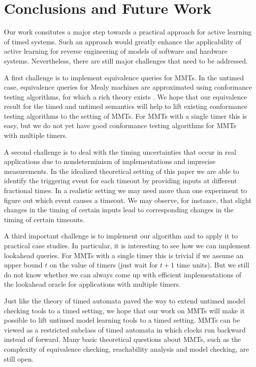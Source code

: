\section{Conclusions and Future Work}
Our work consitutes a major step towards a practical approach for active learning of timed systems.
Such an approach would greatly enhance the applicability of active learning for reverse engineering of models of
software and hardware systems. Nevertheless, there are still major challenges that need to be addressed.

A first challenge is to implement equivalence queries for MMTs.
In the untimed case, equivalence queries for Mealy machines are approximated using conformance testing algorithms,
for which a rich theory exists \cite{LeeY96}.
We hope that our equivalence result for the timed and untimed semantics will help to lift existing conformance
testing algorithms to the setting of MMTs. For MMTs with a single timer this is easy, but we do not yet have good
conformance testing algorithms for MMTs with multiple timers.

A second challenge is to deal with the timing uncertainties that occur in real applications due to nondeterminism of
implementations and imprecise measurements. In the idealized theoretical setting of this paper we are able to
identify the triggering event for each timeout by providing inputs at different fractional times. In a realistic
setting we may need more than one experiment to figure out which event causes a timeout. We may observe, for instance,
that slight changes in the timing of certain inputs lead to corresponding changes in the timing of certain timeouts.

A third important challenge is to implement our algorithm and to apply it to practical case studies. In particular,
it is interesting to see how we can implement lookahead queries. For MMTs with a single timer this is trivial 
if we assume an upper bound $t$ on the value of timers (just  wait for $t+1$ time units).
But we still do not know whether we can always come up with efficient implementations of the lookahead oracle for applications with multiple timers.

Just like the theory of timed automata \cite{AD94} paved the way to extend untimed model checking tools to a timed
setting, we hope that our work on MMTs will make it possible to lift untimed model learning tools to a timed setting.
MMTs can be viewed as a restricted subclass of timed automata in which clocks run backward instead of forward.
Many basic theoretical questions about MMTs, such as the complexity of equivalence checking, reachability analysis
and model checking, are still open.
